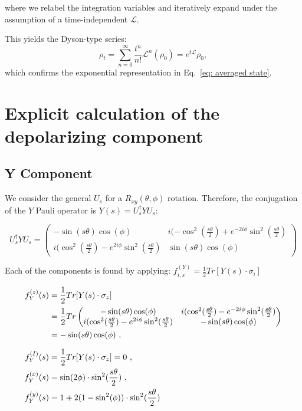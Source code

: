 \documentclass[9pt,a4paper,twocolumn,twoside]{tau-class/tau}
\begin{document}
where we relabel the integration variables and iteratively expand under the assumption of a time-independent \( \mathcal{L} \). 

This yields the Dyson-type series:
\begin{equation}
    \rho_t = \sum_{n=0}^\infty \frac{t^n}{n!} \mathcal{L}^n(\rho_0) = e^{t\mathcal{L}} \rho_0,
    \label{eq: exponential lindblad}
\end{equation}
which confirms the exponential representation in Eq.~\eqref{eq: averaged state}. 

\section{Explicit calculation of the depolarizing component}
\label{appendix:Y Component}

\subsection{Y Component}
We consider the general $U_s$ for a $R_{xy}(\theta,\phi)$ rotation.
Therefore, the conjugation of the $Y$ Pauli operator is $Y(s) = U_s^\dagger Y U_s$:

\begin{equation}
    U_s^\dagger Y U_s = \begin{pmatrix}
    -\sin(s\theta)\cos(\phi) & i(-\cos^2(\frac{s\theta}{2})+e^{-2i\phi} \sin^2(\frac{s\theta}{2})\\
    i(\cos^2(\frac{s\theta}{2})-e^{2i\phi} \sin^2(\frac{s\theta}{2}) & \sin(s\theta)\cos(\phi) 
\end{pmatrix}
\end{equation}

Each of the components is found by applying:  $f_{i,s}^{(Y)} = \frac{1}{2} Tr[Y(s) \cdot \sigma_i]$ 

\begin{align}
    f_Y^{(z)}(s) &= \frac{1}{2}Tr[Y(s) \cdot \sigma_z] \notag \\  &= \frac{1}{2}Tr\begin{pmatrix}
    -\sin(s\theta)\cos(\phi) & i(\cos^2(\frac{s\theta}{2})-e^{-2i\phi} \sin^2(\frac{s\theta}{2}) \\
    i(\cos^2(\frac{s\theta}{2})-e^{2i\phi} \sin^2(\frac{s\theta}{2}) & -\sin(s\theta)\cos(\phi) 
\end{pmatrix} \notag \\
    &= -\sin(s\theta)\cos(\phi) \ ,\\[1.5ex]
    f_Y^{(I)}(s) &= \frac{1}{2}Tr[Y(s) \cdot \sigma_z] = 0 \ ,\\
    f_Y^{(x)}(s) &= \sin(2\phi)\cdot \sin^2(\frac{s\theta}{2})\ ,\\
    f_Y^{(y)}(s) &= 1 + 2(1-\sin^2(\phi))\cdot \sin^2(\frac{s\theta}{2})
    \label{eq: f_Y}
\end{align}
\end{document}
